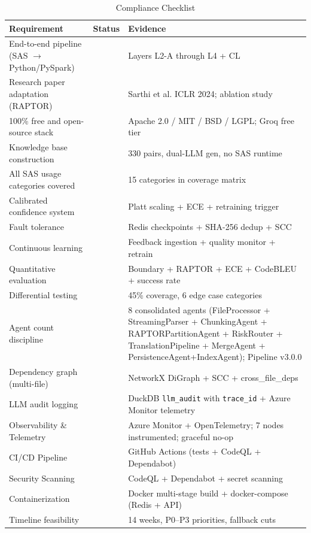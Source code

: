 \documentclass[11pt,a4paper]{article}
\newcommand{\cmark}{\textcolor{successgreen}{\ding{51}}}
\begin{document}
\begin{table}[H]
\centering
\caption{Compliance Checklist}
\renewcommand{\arraystretch}{1.3}
\begin{tabularx}{\textwidth}{@{} X c l @{}}
\toprule
\textbf{Requirement} & \textbf{Status} & \textbf{Evidence} \\
\midrule
End-to-end pipeline (SAS $\to$ Python/PySpark) & \cmark & Layers L2-A through L4 + CL \\
Research paper adaptation (RAPTOR) & \cmark & Sarthi et al. ICLR 2024; ablation study \\
100\% free and open-source stack & \cmark & Apache 2.0 / MIT / BSD / LGPL; Groq free tier \\
Knowledge base construction & \cmark & 330 pairs, dual-LLM gen, no SAS runtime \\
All SAS usage categories covered & \cmark & 15 categories in coverage matrix \\
Calibrated confidence system & \cmark & Platt scaling + ECE + retraining trigger \\
Fault tolerance & \cmark & Redis checkpoints + SHA-256 dedup + SCC \\
Continuous learning & \cmark & Feedback ingestion + quality monitor + retrain \\
Quantitative evaluation & \cmark & Boundary + RAPTOR + ECE + CodeBLEU + success rate \\
Differential testing & \cmark & 45\% coverage, 6 edge case categories \\
Agent count discipline & \cmark & 8 consolidated agents (FileProcessor + StreamingParser + ChunkingAgent + RAPTORPartitionAgent + RiskRouter + TranslationPipeline + MergeAgent + PersistenceAgent+IndexAgent); Pipeline v3.0.0 \\
Dependency graph (multi-file) & \cmark & NetworkX DiGraph + SCC + cross\_file\_deps \\
LLM audit logging & \cmark & DuckDB \texttt{llm\_audit} with \texttt{trace\_id} + Azure Monitor telemetry \\
Observability \& Telemetry & \cmark & Azure Monitor + OpenTelemetry; 7 nodes instrumented; graceful no-op \\
CI/CD Pipeline & \cmark & GitHub Actions (tests + CodeQL + Dependabot) \\
Security Scanning & \cmark & CodeQL + Dependabot + secret scanning \\
Containerization & \cmark & Docker multi-stage build + docker-compose (Redis + API) \\
Timeline feasibility & \cmark & 14 weeks, P0–P3 priorities, fallback cuts \\
\bottomrule
\end{tabularx}
\end{table}
\end{document}
